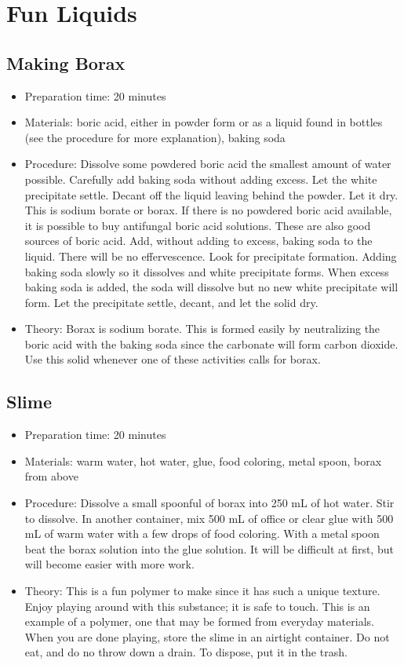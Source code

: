 \section{Fun Liquids}

\subsection{Making Borax}
\begin{itemize}
\item{Preparation time: 20 minutes}
\item{Materials: boric acid, either in powder form or as a liquid found in bottles (see the procedure for more explanation), baking soda}
\item{Procedure: Dissolve some powdered boric acid the smallest amount of water possible. Carefully add baking soda without adding excess. Let the white precipitate settle. Decant off the liquid leaving behind the powder. Let it dry. This is sodium borate or borax. If there is no powdered boric acid available, it is possible to buy antifungal boric acid solutions. These are also good sources of boric acid. Add, without adding to excess, baking soda to the liquid. There will be no effervescence. Look for precipitate formation. Adding baking soda slowly so it dissolves and white precipitate forms. When excess baking soda is added, the soda will dissolve but no new white precipitate will form. Let the precipitate settle, decant, and let the solid dry. }
\item{Theory: Borax is sodium borate. This is formed easily by neutralizing the boric acid with the baking soda since the carbonate will form carbon dioxide. Use this solid whenever one of these activities calls for borax.}
\end{itemize}

\subsection{Slime}
\begin{itemize}
\item{Preparation time: 20 minutes}
\item{Materials: warm water, hot water, glue, food coloring, metal spoon, borax from above}
\item{Procedure: Dissolve a small spoonful of borax into 250 mL of hot water. Stir to dissolve. In another container, mix 500 mL of office or clear glue with 500 mL of warm water with a few drops of food coloring. With a metal spoon beat the borax solution into the glue solution. It will be difficult at first, but will become easier with more work.}
\item{Theory: This is a fun polymer to make since it has such a unique texture. Enjoy playing around with this substance; it is safe to touch. This is an example of a polymer, one that may be formed from everyday materials. When you are done playing, store the slime in an airtight container. Do not eat, and do no throw down a drain. To dispose, put it in the trash.}
\end{itemize}

